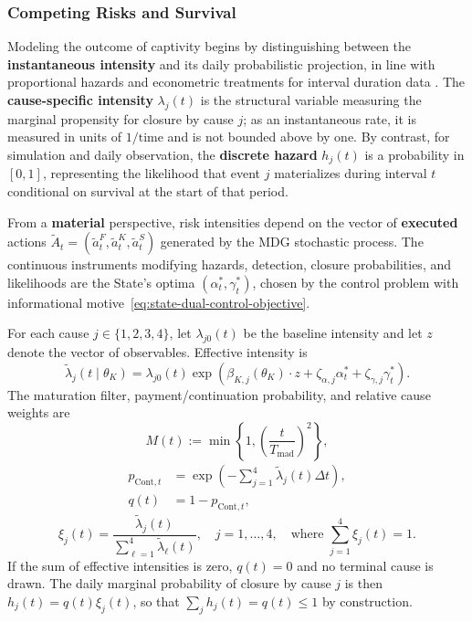 \documentclass[12pt,a4paper]{article}
\providecommand{\textcite}{\citet}
\theoremstyle{plain}
\theoremstyle{definition}
\theoremstyle{remark}
\newcommand{\1}{\mathbf{1}}
\begin{document}
\subsubsection{Competing Risks and Survival}
\label{subsec:intensidades-prop}

Modeling the outcome of captivity begins by distinguishing between the
\textbf{instantaneous intensity} and its daily probabilistic projection, in line with
proportional hazards \textcite{Cox1972} and econometric treatments for interval
duration data \textcite{Greene2012,Wooldridge2010}. The \textbf{cause-specific
intensity} $\lambda_j(t)$ is the structural variable measuring the marginal propensity
for closure by cause $j$; as an instantaneous rate, it is measured in units of
$1/\mathrm{time}$ and is not bounded above by one. By contrast, for simulation and
daily observation, the \textbf{discrete hazard} $h_j(t)$ is a probability in $[0,1]$,
representing the likelihood that event $j$ materializes during interval $t$ conditional
on survival at the start of that period.

From a \textbf{material} perspective, risk intensities depend on the vector of
\textbf{executed} actions
$\tilde A_t=(\tilde a_t^F,\tilde a_t^K,\tilde a_t^S)$ generated by the MDG stochastic
process. The continuous instruments modifying hazards, detection, closure
probabilities, and likelihoods are the State's optima
$(\alpha_t^\ast,\gamma_t^\ast)$, chosen by the control problem with informational
motive~\eqref{eq:state-dual-control-objective}.

For each cause $j\in\{1,2,3,4\}$, let $\lambda_{j0}(t)$ be the baseline intensity and
let $z$ denote the vector of observables. Effective intensity is
\begin{equation}
\label{eq:hj}
\tilde{\lambda}_j(t\mid\theta_K)
=
\lambda_{j0}(t)
\exp\!\left(\beta_{K,j}(\theta_K)\cdot z
+\zeta_{\alpha,j}\alpha_t^\ast
+\zeta_{\gamma,j}\gamma_t^\ast\right).
\end{equation}
The maturation filter, payment/continuation probability, and relative cause weights
are
\begin{equation}
\label{eq:maturation-filter}
M(t):=\min\!\left\{1,\left(\frac{t}{T_{\mathrm{mad}}}\right)^2\right\},
\end{equation}
\begin{align}
\label{eq:pCont}
p_{\mathrm{Cont},t}
&=\exp\!\left(-\sum_{j=1}^{4}\tilde{\lambda}_j(t)\Delta t\right),\\
\label{eq:q}
q(t)&=1-p_{\mathrm{Cont},t},
\end{align}
\begin{equation}
\label{eq:xi}
\xi_j(t)=
\frac{\tilde{\lambda}_j(t)}
{\sum_{\ell=1}^{4}\tilde{\lambda}_{\ell}(t)}, 
\quad j=1,\dots,4,
\quad \text{where } \sum_{j=1}^{4}\xi_j(t)=1.
\end{equation}
If the sum of effective intensities is zero, $q(t)=0$ and no terminal cause is drawn.
The daily marginal probability of closure by cause $j$ is then
$h_j(t)=q(t)\xi_j(t)$, so that $\sum_j h_j(t)=q(t)\le1$ by construction.
\end{document}
